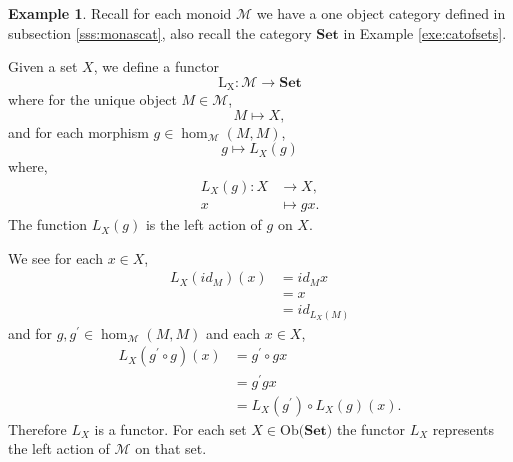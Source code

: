\documentclass[11pt,a4paper]{article}
\theoremstyle{definition}
\newtheorem{example}[thm]{Example}
\newcommand\ho[3][]{\hom_{#1}(#2,#3)}
\newcommand\ob[1]{\mathrm{Ob(}#1\mathrm{)}}
\newcommand\cat[1]{\mathscr{#1}}
\newcommand\func[3]{\mathrm{#1}\colon#2\rightarrow#3}
\numberwithin{equation}{section}
\begin{document}
\begin{example}
\label{exe:leftactionfunc}
    Recall for each monoid $\cat{M}$ we have a one object category defined in subsection \ref{sss:monascat}, also recall the category $\mathbf{Set}$ in Example \ref{exe:catofsets}. 
    
    Given a set $X$, we define a functor
    \[\func{L_{X}}{\cat{M}}{\mathbf{Set}}\]
    where for the unique object $M\in\cat{M}$,
    \[M\mapsto X,\]
    and for each morphism $g\in\ho[\cat{M}]{M}{M}$,
    \[g\mapsto L_{X}(g)\]
    where,
    \begin{align*}
        L_{X}(g) \colon X &\to X,\\
            x &\mapsto gx.
    \end{align*}
    The function $L_{X}(g)$ is the left action of $g$ on $X$.
    
    We see for each $x\in X$,
    \begin{align*}
        L_{X}(id_{M})(x) &= id_{M}x \\
        &= x \\
        &= id_{L_{X}(M)}
    \end{align*}
    and for $g,g^\prime\in\ho[\cat{M}]{M}{M}$ and each $x\in X$,
    \begin{align*}
        L_{X}(g^\prime\circ g)(x) &= g^\prime\circ g x \\
        &= g^\prime gx \\
        &= L_{X}(g^\prime)\circ L_{X}(g)(x).
    \end{align*}
    Therefore $L_{X}$ is a functor. For each set $X\in\ob{\mathbf{Set}}$ the functor $L_{X}$ represents the left action of $\cat{M}$ on that set.
\end{example}
\end{document}
